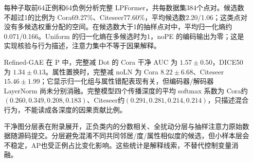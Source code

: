 每种子取前64正例和64负例分析完整 LPFormer，共每数据集384个点对。候选数不超过1的比例为 Cora69.27\%、Citeseer77.60\%，平均候选数2.20/1.06；这类点对没有多候选权重分配的空间。在候选数大于1的抽样点对中，平均归一化熵约0.071/0.166。Uniform 的归一化熵在多候选时为1，noPE 的编码输出为零；这是实现核验与行为描述，注意力集中不等于因果解释。

Refined-GAE 在 P 中，完整减 Dot 的 Cora 干净 AUC 为 $1.57\pm0.50$，DICE50 为 $1.34\pm0.13$。属性置换时，完整减 noLN 为 Cora $8.22\pm6.68$、Citeseer $15.46\pm1.99$；它显示归一化组与属性错配表现有关，但编码器/解码器 LayerNorm 尚未分别消融。完整模型四个传播深度的平均 softmax 系数为 Cora约$(0.260,0.349,0.208,0.183)$、Citeseer约$(0.291,0.281,0.214,0.214)$，只描述混合行为，不能读成各深度的因果贡献比例。

干净图分层表在附录展开，正负类内的分数相关、全扰动分层与抽样注意力原始数据随源码提交。分层避免混淆不同共同邻居/度/属性相似度的候选，但小样本层会不稳定，AP也受正例占比变化影响。这些统计是解释线索，不替代控制变量消融。
